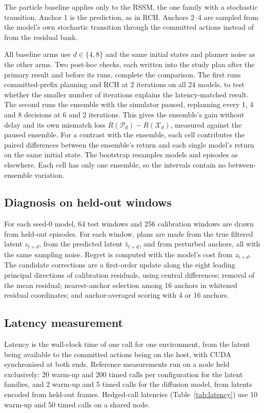 \documentclass[pdflatex,sn-nature]{sn-jnl}%
\begin{document}
The particle baseline applies only to the RSSM, the one family with a stochastic transition. Anchor 1 is the prediction, as in RCH. Anchors 2--4 are sampled from the model's own stochastic transition through the committed actions instead of from the residual bank.

All baseline arms use $d\in\{4,8\}$ and the same initial states and planner noise as the other arms. Two post-hoc checks, each written into the study plan after the primary result and before its runs, complete the comparison. The first runs committed-prefix planning and RCH at 2 iterations on all 24 models, to test whether the smaller number of iterations explains the latency-matched result. The second runs the ensemble with the simulator paused, replanning every 1, 4 and 8 decisions at 6 and 2 iterations. This gives the ensemble's gain without delay and its own mismatch loss $R(\mathcal{P}_d)-R(\mathcal{X}_d)$, measured against the paused ensemble. For a contrast with the ensemble, each cell contributes the paired differences between the ensemble's return and each single model's return on the same initial state. The bootstrap resamples models and episodes as elsewhere. Each cell has only one ensemble, so the intervals contain no between-ensemble variation.

\subsection{Diagnosis on held-out windows}\label{app:diagnosis}

For each seed-0 model, 64 test windows and 256 calibration windows are drawn from held-out episodes. For each window, plans are made from the true filtered latent $z_{t+d}$, from the predicted latent $\hat z_{t+d}$, and from perturbed anchors, all with the same sampling noise. Regret is computed with the model's cost from $z_{t+d}$. The candidate corrections are a first-order update along the eight leading principal directions of calibration residuals, using central differences; removal of the mean residual; nearest-anchor selection among 16 anchors in whitened residual coordinates; and anchor-averaged scoring with 4 or 16 anchors.

\subsection{Latency measurement}\label{app:latency}

Latency is the wall-clock time of one call for one environment, from the latent being available to the committed actions being on the host, with CUDA synchronised at both ends. Reference measurements run on a node held exclusively: 20 warm-up and 200 timed calls per configuration for the latent families, and 2 warm-up and 5 timed calls for the diffusion model, from latents encoded from held-out frames. Hedged-call latencies (Table~\ref{tab:latency}) use 10 warm-up and 50 timed calls on a shared node.
\end{document}
